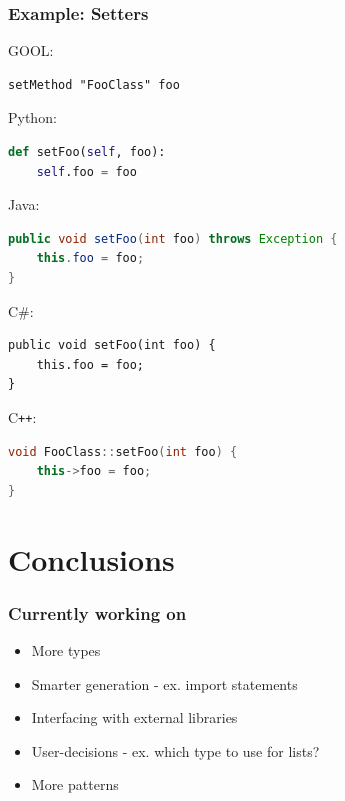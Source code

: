 \documentclass{beamer}
\newcommand{\Csharp}{C\#}
\newcommand{\Cplusplus}{C\texttt{++}}
\begin{document}
\begin{frame}[fragile]

\frametitle{Example: Setters}

GOOL:
\begin{lstlisting}
setMethod "FooClass" foo
\end{lstlisting}
\vspace{\baselineskip}

\begin{overprint}
Python:
\begin{lstlisting}[language=Python]
def setFoo(self, foo):
    self.foo = foo
\end{lstlisting}

Java:
\begin{lstlisting}[language=java]
public void setFoo(int foo) throws Exception {
    this.foo = foo;
}
\end{lstlisting}

\Csharp:
\lstset{language=[Sharp]C}
\begin{lstlisting}
public void setFoo(int foo) {
    this.foo = foo;
}
\end{lstlisting}
\lstset{language=haskell}

\Cplusplus:
\begin{lstlisting}[language=C++]
void FooClass::setFoo(int foo) {
    this->foo = foo;
}
\end{lstlisting}
\end{overprint}

\end{frame}


\section[Conclusions]{Conclusions}


\begin{frame}

\frametitle{Currently working on}

\begin{itemize}
  \item More types
  \item Smarter generation - ex. import statements
  \item Interfacing with external libraries
  \item User-decisions - ex. which type to use for lists?
  \item More patterns
\end{itemize}

\end{frame}
\end{document}
